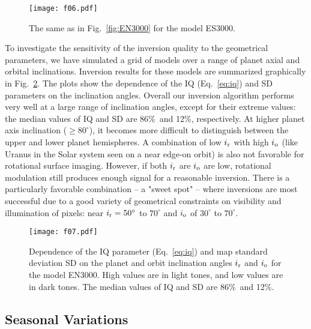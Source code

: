 \documentclass{emulateapj}
\begin{document}
\begin{figure}
\centering
\texttt{[image: f06.pdf]}
\caption{The same as in Fig.~\ref{fig:EN3000} for the model ES3000.  }
\label{fig:ES3000}
\end{figure}

To investigate the sensitivity of the inversion quality to the geometrical parameters, we have
simulated a grid of models over a range of planet axial and orbital inclinations.
Inversion results for these models are summarized graphically in Fig.~\ref{fig:iq_inc}.
The plots show the dependence of the IQ (Eq.~\ref{eq:iq}) and SD parameters
on the inclination angles. 
Overall our inversion algorithm performs very well at a large range of inclination
angles, except for their extreme values: the median values of IQ and SD are
86\%\ and 12\%, respectively.
At higher planet axis inclination ($\ge80^\circ$), 
it becomes more difficult to distinguish between the upper and lower planet hemispheres.
A combination of low $i_{\rm r}$ with high $i_{\rm o}$ (like Uranus in the Solar system
seen on a near edge-on orbit) is also not favorable for rotational surface imaging.
However, if both $i_{\rm r}$ are $i_{\rm o}$ are low, rotational modulation still produces
enough signal for a reasonable inversion.
There is a particularly favorable combination -- a "sweet spot" -- 
where inversions are most successful due to a good variety of geometrical 
constraints on visibility and illumination of pixels: near 
$i_{\rm r}=50^\circ$ to $70^\circ$ and
$i_{\rm o}$ of $30^\circ$ to $70^\circ$.

\begin{figure}
\centering
\texttt{[image: f07.pdf]}
\caption{Dependence of the IQ parameter (Eq.~\ref{eq:iq}) and map standard deviation SD
on the planet and orbit inclination angles $i_{\rm r}$ and $i_{\rm o}$ for the model EN3000. 
High values are in light tones, and low values are in dark tones.
The median values of IQ and SD are 86\%\ and 12\%.}
\label{fig:iq_inc}
\end{figure}

\subsection{Seasonal Variations}\label{sec:inve_seasons}
\end{document}
